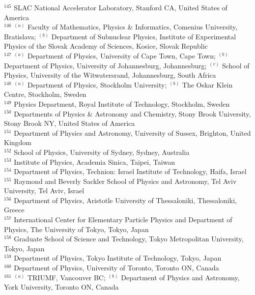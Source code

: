 \begin{flushleft}
$^{145}$ SLAC National Accelerator Laboratory, Stanford CA, United States of America\\
$^{146}$ $^{(a)}$ Faculty of Mathematics, Physics {\&} Informatics, Comenius University, Bratislava; $^{(b)}$ Department of Subnuclear Physics, Institute of Experimental Physics of the Slovak Academy of Sciences, Kosice, Slovak Republic\\
$^{147}$ $^{(a)}$ Department of Physics, University of Cape Town, Cape Town; $^{(b)}$ Department of Physics, University of Johannesburg, Johannesburg; $^{(c)}$ School of Physics, University of the Witwatersrand, Johannesburg, South Africa\\
$^{148}$ $^{(a)}$ Department of Physics, Stockholm University; $^{(b)}$ The Oskar Klein Centre, Stockholm, Sweden\\
$^{149}$ Physics Department, Royal Institute of Technology, Stockholm, Sweden\\
$^{150}$ Departments of Physics {\&} Astronomy and Chemistry, Stony Brook University, Stony Brook NY, United States of America\\
$^{151}$ Department of Physics and Astronomy, University of Sussex, Brighton, United Kingdom\\
$^{152}$ School of Physics, University of Sydney, Sydney, Australia\\
$^{153}$ Institute of Physics, Academia Sinica, Taipei, Taiwan\\
$^{154}$ Department of Physics, Technion: Israel Institute of Technology, Haifa, Israel\\
$^{155}$ Raymond and Beverly Sackler School of Physics and Astronomy, Tel Aviv University, Tel Aviv, Israel\\
$^{156}$ Department of Physics, Aristotle University of Thessaloniki, Thessaloniki, Greece\\
$^{157}$ International Center for Elementary Particle Physics and Department of Physics, The University of Tokyo, Tokyo, Japan\\
$^{158}$ Graduate School of Science and Technology, Tokyo Metropolitan University, Tokyo, Japan\\
$^{159}$ Department of Physics, Tokyo Institute of Technology, Tokyo, Japan\\
$^{160}$ Department of Physics, University of Toronto, Toronto ON, Canada\\
$^{161}$ $^{(a)}$ TRIUMF, Vancouver BC; $^{(b)}$ Department of Physics and Astronomy, York University, Toronto ON, Canada\\

\end{flushleft}
